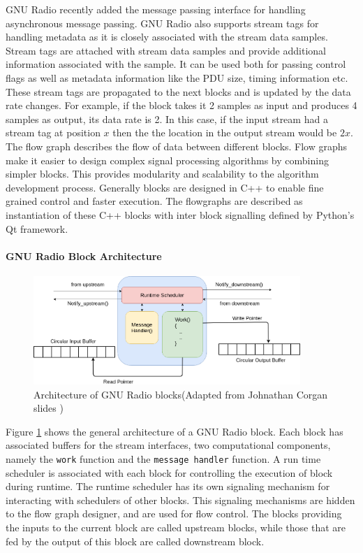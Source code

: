 GNU Radio recently added the message passing interface for handling asynchronous message passing.
GNU Radio also supports stream tags for handling metadata as it is closely associated with the stream data samples.
Stream tags are attached with stream data samples and provide additional information associated with the sample.
It can be used both for passing control flags as well as metadata information like the \ac{PDU} size, timing information etc.
These stream tags are propagated to the next blocks and is updated by the data rate changes.
For example, if the block takes it 2 samples as input and produces 4 samples as output, its data rate is 2.
In this case, if the input stream had a stream tag at position $x$ then the the location in the output stream would be $2x$. \\


The flow graph describes the flow of data between different blocks.
Flow graphs make it easier to design complex signal processing algorithms by combining simpler blocks.
This provides modularity and scalability to the algorithm development process.
Generally blocks are designed in C++ to enable fine grained control and faster execution.
The flowgraphs are described as instantiation of these C++ blocks with inter block signalling defined by Python's Qt framework.\\

\paragraph{GNU Radio Block Architecture}
\begin{figure}[h!]
\centering
\includegraphics[width=0.9\textwidth]{Figure/Block.png}
\caption{Architecture of GNU Radio blocks(Adapted from Johnathan Corgan slides \cite{corgan_gnu_2015})}
\label{block_arch}
\end{figure}

Figure \ref{block_arch} shows the general architecture of a GNU Radio block. 
Each block has associated buffers for the stream interfaces, two computational components, namely the \texttt{work} function and the \texttt{message handler} function.
A run time scheduler is associated with each block for controlling the execution of block during runtime. The runtime scheduler has its own signaling mechanism for interacting with schedulers of other blocks.
This signaling mechanisms are hidden to the flow graph designer, and are used for flow control.
The blocks providing the inputs to the current block are called upstream blocks, while those that are fed by the output of this block are called downstream block.\\

